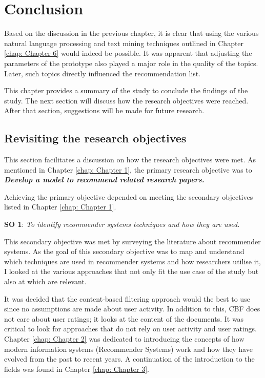 \chapter{Conclusion}
\label{chap: Chapter 8}

Based on the discussion in the previous chapter, it is clear that using the various natural language processing and text mining techniques outlined in Chapter \ref{chap: Chapter 6} would indeed be possible. It was apparent that adjusting the parameters of the prototype also played a major role in the quality of the topics. Later, such topics directly influenced the recommendation list.

This chapter provides a summary of the study to conclude the findings of the study. The next section will discuss how the research objectives were reached. After that section, suggestions will be made for future research.

\section{Revisiting the research objectives}

This section facilitates a discussion on how the research objectives were met. As mentioned in Chapter \ref{chap: Chapter 1}, the primary research objective was to \textbf{\textit{Develop a model to recommend related research papers.}}

Achieving the primary objective depended on meeting the secondary objectives listed in Chapter \ref{chap: Chapter 1}.

\textbf{SO 1}: \textit{To identify recommender systems techniques and how they are used.}

This secondary objective was met by surveying the literature about recommender systems. As the goal of this secondary objective was to map and understand which techniques are used in recommender systems and how researchers utilise it, I looked at the various approaches that not only fit the use case of the study but also at which are relevant. 

It was decided that the content-based filtering approach would the best to use since no assumptions are made about user activity. In addition to this, CBF does not care about user ratings; it looks at the content of the documents. It was critical to look for approaches that do not rely on user activity and user ratings. Chapter \ref{chap: Chapter 2} was dedicated to introducing the concepts of how modern information systems (Recommender Systems) work and how they have evolved from the past to recent years. A continuation of the introduction to the fields was found in Chapter \ref{chap: Chapter 3}.

